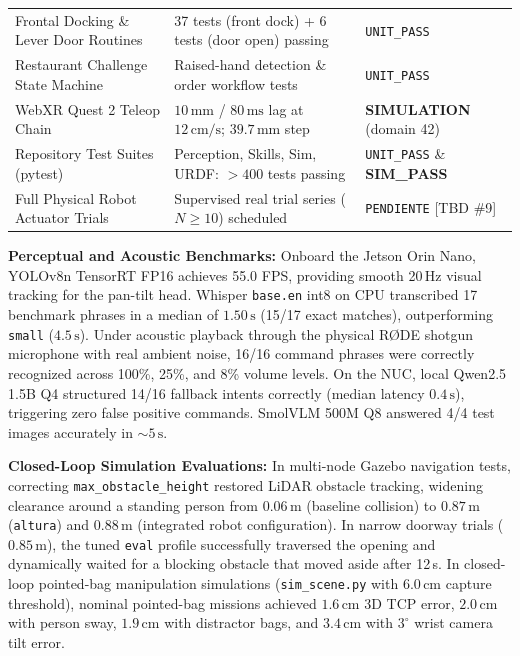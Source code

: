 \documentclass[runningheads,a4paper]{llncs}
\begin{document}
\begin{table}[tb]
\begin{tabular}{lll}
Frontal Docking \& Lever Door Routines & 37 tests (front dock) + 6 tests (door open) passing & \texttt{UNIT\_PASS} \\
Restaurant Challenge State Machine & Raised-hand detection \& order workflow tests & \texttt{UNIT\_PASS} \\
WebXR Quest 2 Teleop Chain & $10\,\text{mm}$ / $80\,\text{ms}$ lag at $12\,\text{cm/s}$; $39.7\,\text{mm}$ step & \textbf{SIMULATION} (domain 42) \\
Repository Test Suites (pytest) & Perception, Skills, Sim, URDF: $>400$ tests passing & \texttt{UNIT\_PASS} \& \textbf{SIM\_PASS} \\
Full Physical Robot Actuator Trials & Supervised real trial series ($N \ge 10$) scheduled & \texttt{PENDIENTE} [TBD \#9] \\
\bottomrule
\end{tabular}
\end{table}

\textbf{Perceptual and Acoustic Benchmarks:} Onboard the Jetson Orin Nano, YOLOv8n TensorRT FP16 achieves 55.0 FPS, providing smooth 20\,Hz visual tracking for the pan-tilt head. Whisper \texttt{base.en} int8 on CPU transcribed 17 benchmark phrases in a median of $1.50\,\text{s}$ (15/17 exact matches), outperforming \texttt{small} ($4.5\,\text{s}$). Under acoustic playback through the physical R\O{}DE shotgun microphone with real ambient noise, 16/16 command phrases were correctly recognized across 100\%, 25\%, and 8\% volume levels. On the NUC, local Qwen2.5 1.5B Q4 structured 14/16 fallback intents correctly (median latency $0.4\,\text{s}$), triggering zero false positive commands. SmolVLM 500M Q8 answered 4/4 test images accurately in $\sim 5\,\text{s}$.

\textbf{Closed-Loop Simulation Evaluations:} In multi-node Gazebo navigation tests, correcting \texttt{max\_obstacle\_height} restored LiDAR obstacle tracking, widening clearance around a standing person from $0.06\,\text{m}$ (baseline collision) to $0.87\,\text{m}$ (\texttt{altura}) and $0.88\,\text{m}$ (integrated robot configuration). In narrow doorway trials ($0.85\,\text{m}$), the tuned \texttt{eval} profile successfully traversed the opening and dynamically waited for a blocking obstacle that moved aside after 12\,s. In closed-loop pointed-bag manipulation simulations (\texttt{sim\_scene.py} with $6.0\,\text{cm}$ capture threshold), nominal pointed-bag missions achieved $1.6\,\text{cm}$ 3D TCP error, $2.0\,\text{cm}$ with person sway, $1.9\,\text{cm}$ with distractor bags, and $3.4\,\text{cm}$ with $3^\circ$ wrist camera tilt error.
\end{document}
